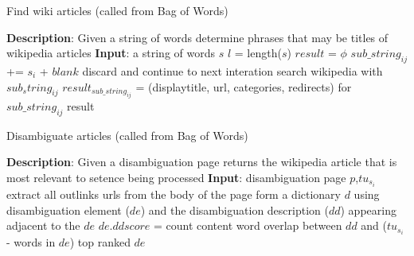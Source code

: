\documentclass[12pt]{article}
\begin{document}
\begin{algorithm}
\small
\caption{Find wiki articles (called from Bag of Words)}
\label{alg:findwikiarticles}
\begin{algorithmic}
\STATE \textbf{Description}: Given a string of words determine phrases
that may be titles of wikipedia articles
\STATE \textbf{Input}: a string of words $s$
\STATE $l$ = length($s$)
\STATE $result$ = $\phi$
               \STATE $sub\_string_{ij}$ += $s_i$ + $blank$
       \ENDFOR
               \STATE discard and continue to next interation
       \ELSE
               \STATE search wikipedia with $sub_string_{ij}$
               \STATE $result_{sub\_string_{ij}}$ = (displaytitle, url, categories,
redirects) for $sub\_string_{ij}$
       \ENDIF
\ENDFOR
\RETURN result
\end{algorithmic}
\end{algorithm}


\begin{algorithm}
\small
\caption{Disambiguate articles (called from Bag of Words)}
\label{alg:disambiguate}
\begin{algorithmic}
\STATE \textbf{Description}: Given a disambiguation page returns the
wikipedia article that is most relevant to setence being processed
\STATE \textbf{Input}: disambiguation page $p$,$tu_{s_{i}}$
\STATE extract all outlinks urls from the body of the page
\STATE form a dictionary $d$ using disambiguation element ($de$) and
the disambiguation description ($dd$) appearing adjacent to the $de$
       \STATE $de.ddscore$ = count content word overlap between $dd$ and
($tu_{s_{i}}$ - words in  $de$)
\ENDFOR
\RETURN top ranked $de$
\end{algorithmic}
\end{algorithm}
\end{document}
